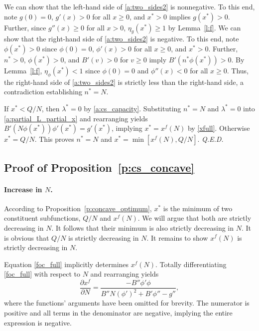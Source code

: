 \documentclass[12pt]{article}
\renewcommand{\qed}{{\it Q.E.D.}}
\newcommand{\efficacy}{\phi}
\newcommand{\general}{g}
\newcommand{\benefit}{B}
\newcommand{\xfull}{x^{f\!}}
\newcommand{\elasticity}[1]{\eta_{#1}}
\begin{document}
We can show that the left-hand side of \eqref{a:two_sides2} is
nonnegative. To this end, note $\general(0) = 0$, $\general'(x) > 0$
for all $x \geq 0$, and $x^* > 0$ implies $\general(x^*) >
0$. Further, since $\general''(x) \geq 0$ for all $x > 0$,
$\elasticity{\general}(x^*) \geq 1$ by Lemma~\ref{l:f}.  We can show
that the right-hand side of \eqref{a:two_sides2} is negative.  To this
end, note $\efficacy(x^*) > 0$ since $\efficacy(0) = 0$,
$\efficacy'(x) > 0$ for all $x \geq 0$, and $x^* > 0$. Further, $n^* >
0$, $\efficacy(x^*) > 0$, and $\benefit'(v) > 0$ for $v \geq 0$ imply
$\benefit'(n^* \efficacy(x^*)) > 0$. By Lemma~\ref{l:f},
$\elasticity{\efficacy}(x^*) < 1$ since $\efficacy(0) = 0$ and
$\efficacy''(x) < 0$ for all $x \geq 0$. Thus, the right-hand side of
\eqref{a:two_sides2} is strictly less than the right-hand side, a
contradiction establishing $n^* = N$.

If $x^* < Q/N$, then $\lambda^* = 0$ by
\eqref{a:cs_capacity}. Substituting $n^* = N$ and $\lambda^* = 0$ into
\eqref{a:partial_L_partial_x} and rearranging yields $\benefit'(N
\efficacy(x^*))\efficacy'(x^*) = \general'(x^*)$, implying $x^* =
\xfull(N)$ by \eqref{xfull}. Otherwise $x^* = Q/N$. This proves $n^* =
N$ and $x^* = \min [\xfull(N), Q/N]$.  \qed


\subsection*{Proof of Proposition~\ref{p:cs_concave}}

\paragraph{Increase in $N$.}

According to Proposition~\ref{p:concave_optimum}, $x^*$ is the minimum of two constituent subfunctions, $Q/N$ and $\xfull(N)$. We will argue that both are strictly decreasing in $N$. It follows that their minimum is also strictly decreasing in $N$. It is obvious that $Q/N$ is strictly decreasing in $N$. It remains to show $\xfull(N)$ is strictly decreasing in $N$. 

Equation \eqref{foc_full} implicitly determines $\xfull(N)$. Totally differentiating \eqref{foc_full} with respect to $N$ and rearranging yields
\begin{equation}
\label{a:csN1}
\frac{\partial \xfull}{\partial N} = \frac{-\benefit'' \efficacy' \efficacy}{\benefit'' N (\efficacy')^2 + \benefit' \efficacy'' - g''},
\end{equation}
where the functions' arguments have been omitted for brevity. The numerator is positive and all terms in the denominator are negative, implying the entire expression is negative. 
\end{document}
